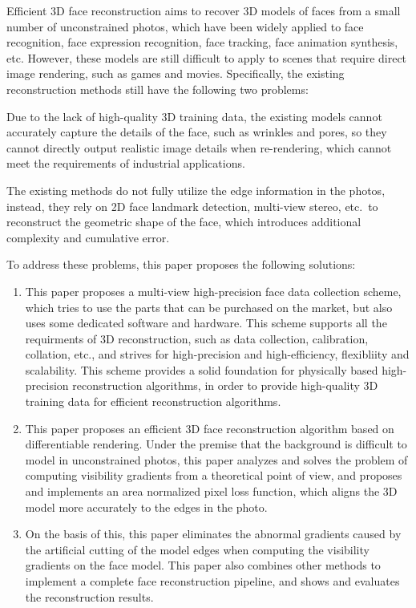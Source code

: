 \documentclass{scutmaster}
\begin{document}
Efficient 3D face reconstruction aims to recover 3D models of faces from a small number of unconstrained photos,
which have been widely applied to face recognition, face expression recognition, face tracking, face animation synthesis, etc.
However, these models are still difficult to apply to scenes that require direct image rendering, such as games and movies.
Specifically, the existing reconstruction methods still have the following two problems:
\begin{enumerate*}
\item Due to the lack of high-quality 3D training data, the existing models cannot accurately capture the details of the face,
such as wrinkles and pores,
so they cannot directly output realistic image details when re-rendering, which cannot meet the requirements of industrial applications.
\item The existing methods do not fully utilize the edge information in the photos,
instead, they rely on 2D face landmark detection, multi-view stereo, etc.\ to reconstruct the geometric shape of the face,
which introduces additional complexity and cumulative error.
\end{enumerate*}

To address these problems, this paper proposes the following solutions:
\begin{enumerate}
\item This paper proposes a multi-view high-precision face data collection scheme,
which tries to use the parts that can be purchased on the market,
but also uses some dedicated software and hardware.
This scheme supports all the requirments of 3D reconstruction, such as data collection, calibration, collation, etc.,
and strives for high-precision and high-efficiency, flexibliity and scalability.
This scheme provides a solid foundation for physically based high-precision reconstruction algorithms,
in order to provide high-quality 3D training data for efficient reconstruction algorithms.
\item This paper proposes an efficient 3D face reconstruction algorithm based on differentiable rendering.
Under the premise that the background is difficult to model in unconstrained photos, this paper analyzes and solves the problem of computing visibility gradients from a theoretical point of view,
and proposes and implements an area normalized pixel loss function,
which aligns the 3D model more accurately to the edges in the photo.
\item On the basis of this, this paper eliminates the abnormal gradients caused by the artificial cutting of the model edges when computing the visibility gradients on the face model.
This paper also combines other methods to implement a complete face reconstruction pipeline,
and shows and evaluates the reconstruction results.
\end{enumerate}
\end{document}
